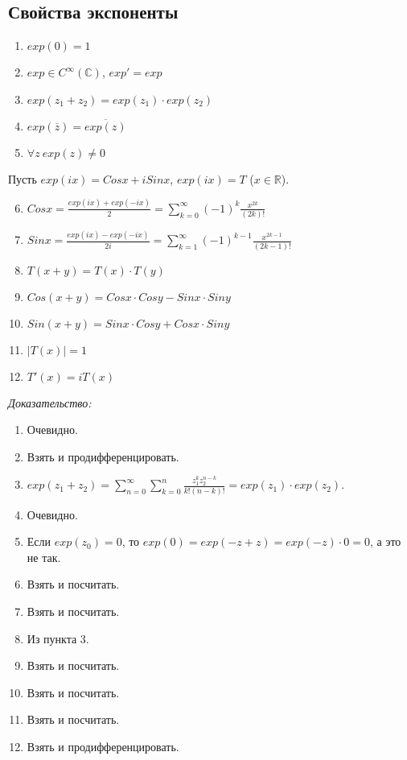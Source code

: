 \documentclass[paper=a4, fontsize=11pt]{article}
\begin{document}
\subsection{Свойства экспоненты}
\begin{enumerate}
    \item $exp(0)=1$
    \item $exp \in C^{\infty}(\mathds{C})$, $exp'=exp$
    \item $exp(z_1+z_2)=exp(z_1)\cdot exp(z_2)$
    \item $exp(\overline{z}) = \overline{exp(z)}$
    \item $\forall z\ exp(z) \neq 0$
\end{enumerate}
Пусть $exp(ix) = Cos x + i Sin x$, $exp(ix) = T$ ($x \in \mathds{R}$).
\begin{enumerate}
    \setcounter{enumi}{5}
    \item $Cos x = \frac{exp(ix)+exp(-ix)}{2} = \sum_{k=0}^{\infty} (-1)^k \frac{x^{2k}}{(2k)!}$
    \item $Sin x = \frac{exp(ix)-exp(-ix)}{2i} = \sum_{k=1}^{\infty} (-1)^{k-1} \frac{x^{2k-1}}{(2k-1)!}$
    \item $T(x+y) = T(x) \cdot T(y)$
    \item $Cos(x+y) = Cos x \cdot Cos y - Sin x \cdot Sin y$
    \item $Sin(x+y) = Sin x \cdot Cos y + Cos x \cdot Sin y$
    \item $|T(x)|=1$
    \item $T'(x)=iT(x)$
\end{enumerate}

\emph{Доказательство:}
\begin{enumerate}
    \item Очевидно.
    \item Взять и продифференцировать.
    \item $exp(z_1 + z_2) = \sum_{n=0}^{\infty} \sum_{k=0}^n \frac{z_1^k z_2^{n-k}}{k!(n-k)!} = exp(z_1) \cdot exp(z_2)$.
    \item Очевидно.
    \item Если $exp(z_0)=0$, то $exp(0) = exp(-z + z) = exp(-z) \cdot 0 = 0$, а это не так.
    \item Взять и посчитать.
    \item Взять и посчитать.
    \item Из пункта 3.
    \item Взять и посчитать.
    \item Взять и посчитать.
    \item Взять и посчитать.
    \item Взять и продифференцировать.
\end{enumerate}
\end{document}
